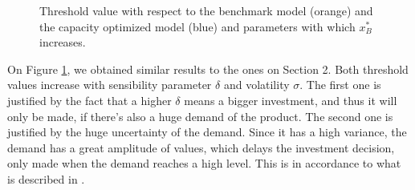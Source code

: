 



\begin{figure}[!htb]
	\begin{subfigmatrix}{2}
	\end{subfigmatrix}
	\caption{Threshold value with respect to the benchmark model (orange) and the capacity optimized model (blue) and parameters with which $x^*_B$ increases.}
	\label{fig:2_x2}
\end{figure}

On Figure \ref{fig:2_x2}, we obtained similar results to the ones on Section 2. Both threshold values increase with sensibility parameter $\delta$ and volatility $\sigma$. The first one is justified by the fact that a higher $\delta$ means a bigger investment, and thus it will only be made, if there's also a huge demand of the product. The second one is justified by the huge uncertainty of the demand. Since it has a high variance, the demand has a great amplitude of values, which delays the investment decision, only made when the demand reaches a high level. This is in accordance to what is described in \cite{dixit:book}.



